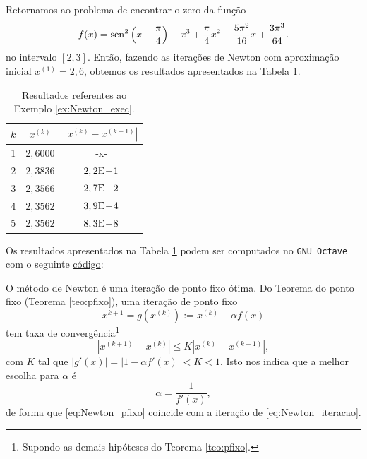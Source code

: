 \begin{ex}\label{ex:Newton_exec}
  Retornamos ao problema de encontrar o zero da função
  \begin{equation}
    f(x) = \operatorname{sen}^2\left(x+\frac{\pi}{4}\right) - x^3 + \frac{\pi}{4}x^2 + \frac{5\pi^2}{16}x + \frac{3\pi^3}{64}.
  \end{equation}
  no intervalo $[2,3]$. Então, fazendo as iterações de Newton com aproximação inicial $x^{(1)}=2,6$, obtemos os resultados apresentados na Tabela \ref{tab:ex_Newton_exec}.

\begin{table}[h!]
  \centering
  \caption{Resultados referentes ao Exemplo \ref{ex:Newton_exec}.}
  \label{tab:ex_Newton_exec}
  \begin{tabular}{r|cc}
    $k$ & $x^{(k)}$ & $|x^{(k)}-x^{(k-1)}|$ \\\hline
    1 & $2,6000$ & -x-\\
    2 & $2,3836$ & $2,2\mathrm{E}\!-\!1$ \\
    3 & $2,3566$ & $2,7\mathrm{E}\!-\!2$ \\
    4 & $2,3562$ & $3,9\mathrm{E}\!-\!4$ \\
    5 & $2,3562$ & $8,3\mathrm{E}\!-\!8$ \\\hline
  \end{tabular}
\end{table}

\ifisoctave
Os resultados apresentados na Tabela \ref{tab:ex_Newton_exec} podem ser computados no \verb+GNU Octave+ com o seguinte \href{https://github.com/phkonzen/notas/blob/master/src/MatematicaNumerica/cap_eq1d/dados/ex_Newton_exec/ex_Newton_exec.m}{código}:

\fi
\end{ex}

\begin{obs}
  O método de Newton é uma iteração de ponto fixo ótima. Do Teorema do ponto fixo (Teorema \ref{teo:pfixo}), uma iteração de ponto fixo
  \begin{equation}\label{eq:Newton_pfixo}
    x^{k+1} = g(x^{(k)}) := x^{(k)} -\alpha f(x)
  \end{equation}
tem taxa de convergência\footnote{Supondo as demais hipóteses do Teorema \ref{teo:pfixo}.}
\begin{equation}
  |x^{(k+1)}-x^{(k)}| \leq K |x^{(k)}-x^{(k-1)}|,
\end{equation}
com $K$ tal que $|g'(x)|=|1 - \alpha f'(x)|<K<1$. Isto nos indica que a melhor escolha para $\alpha$ é
\begin{equation}
  \alpha = \frac{1}{f'(x)},
\end{equation}
de forma que \eqref{eq:Newton_pfixo} coincide com a iteração de \eqref{eq:Newton_iteracao}.
\end{obs}


